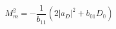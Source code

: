 \begin{equation}
M_{m}^{2}=-\frac{1}{b_{11}}\left( 2\left| a_{D}\right| ^{2}+{b}_{01}D_0\right)   \label{criticalsurf}
\end{equation}

